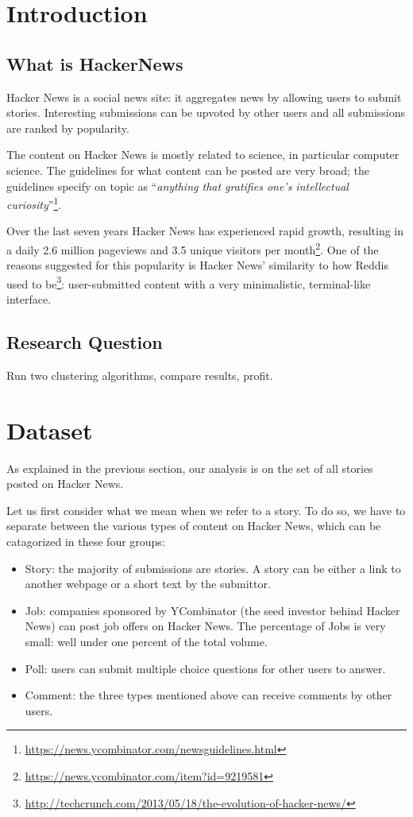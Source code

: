 \section{Introduction}
\subsection{What is HackerNews}
Hacker News is a social news site: it aggregates news by allowing users to submit stories. Interesting submissions can be upvoted by other users and all submissions are ranked by popularity.

The content on Hacker News is mostly related to science, in particular computer science. The guidelines for what content can be posted are very broad; the guidelines specify on topic as ``\textit{anything that gratifies one's intellectual curiosity}''\footnote{\url{https://news.ycombinator.com/newsguidelines.html}}.

Over the last seven years Hacker News has experienced rapid growth, resulting in a daily 2.6 million pageviews and 3.5 unique visitors per month\footnote{\url{https://news.ycombinator.com/item?id=9219581}}. One of the reasons suggested for this popularity is Hacker News' similarity to how Reddis used to be\footnote{\url{http://techcrunch.com/2013/05/18/the-evolution-of-hacker-news/}}: user-submitted content with a very minimalistic, terminal-like interface.

\subsection{Research Question}
Run two clustering algorithms, compare results, profit.

\lipsum[1-1]

\section{Dataset}
As explained in the previous section, our analysis is on the set of all stories posted on Hacker News. 

Let us first consider what we mean when we refer to a story. To do so, we have to separate between the various types of content on Hacker News, which can be catagorized in these four groups:
\begin{itemize}
\item Story: the majority of submissions are stories. A story can be either a link to another webpage or a short text by the submittor.
\item Job: companies sponsored by YCombinator (the seed investor behind Hacker News) can post job offers on Hacker News. The percentage of Jobs is very small: well under one percent of the total volume.
\item Poll: users can submit multiple choice questions for other users to answer.
\item Comment: the three types mentioned above can receive comments by other users.
\end{itemize}

